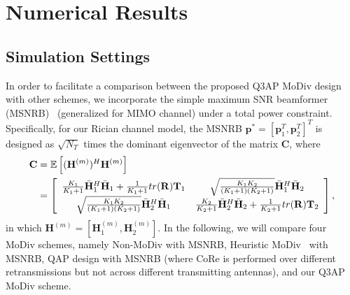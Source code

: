 \documentclass[journal,draftcls,onecolumn,12pt,twoside]{IEEEtran}
\begin{document}
\section{Numerical Results}
\label{sec:numerical}

\subsection{Simulation Settings}
In order to facilitate a comparison between the proposed Q3AP
MoDiv design with other schemes, we incorporate the simple maximum SNR
beamformer (MSNRB)~\cite{barriac2006space} (generalized for MIMO channel) under
a total power constraint.
Specifically, for our Rician channel model, the MSNRB $\mathbf{p}^* =
[\mathbf{p}_1^T, \mathbf{p}_2^T]^T$ is designed as $\sqrt{N_T}$ times the
dominant eigenvector of the matrix $\mathbf{C}$, where
\begin{align}
  \mathbf{C} & = \mathbb{E}\left[
    (\mathbf{H}^{(m)})^H \mathbf{H}^{(m)}
  \right] \notag \\
  & = \left[
    \begin{array}{cc}
      \frac{K_1}{K_1+1}\bar{\mathbf{H}}_1^H\bar{\mathbf{H}}_1 + \frac{1}{K_1+1}
      \mbox{tr}(\mathbf{R})\mathbf{T}_1 &
      \sqrt{\frac{K_1K_2}{(K_1+1)(K_2+1)}} \bar{\mathbf{H}}_1^H
      \bar{\mathbf{H}}_2
      \\
      \sqrt{\frac{K_1K_2}{(K_1+1)(K_2+1)}} \bar{\mathbf{H}}_2^H
      \bar{\mathbf{H}}_1 &
      \frac{K_2}{K_2+1}\bar{\mathbf{H}}_2^H\bar{\mathbf{H}}_2 + \frac{1}{K_2+1}
      \mbox{tr}(\mathbf{R})\mathbf{T}_2
    \end{array}
  \right],
\end{align}
in which $\mathbf{H}^{(m)} = [\mathbf{H}_1^{(m)}, \mathbf{H}_2^{(m)}]$. In
the following, we will compare four MoDiv schemes, namely Non-MoDiv with MSNRB,
Heuristic MoDiv~\cite{panasonic2001enhanced} with MSNRB, QAP design with MSNRB
(where CoRe is performed over different retransmissions but not across different
transmitting antennas), and our Q3AP MoDiv scheme.
\end{document}

